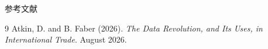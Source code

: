 \documentclass[aspectratio=32]{beamer}
\begin{document}
\begin{frame}{参考文献}
\small
\begin{thebibliography}{9}
Atkin, D. and B. Faber (2026). \newblock \emph{The Data Revolution, and Its Uses, in International Trade}. August 2026.
\end{thebibliography}
\vfill

\begin{center}
\end{center}
\end{frame}
\end{document}
